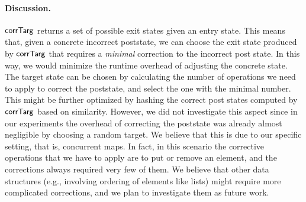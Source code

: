 \paragraph{Discussion.}
$\mathsf{corrTarg}$ returns a set of possible exit states given an entry state. This means that, given a concrete incorrect poststate, we can choose the exit state produced by $\mathsf{corrTarg}$ that requires a \emph{minimal} correction to the incorrect post state. In this way, we would minimize the runtime overhead of adjusting the concrete state. The target state can be chosen by calculating the number of operations we need to apply to correct the poststate, and select the one with the minimal number. This might be further optimized by hashing the correct post states computed by $\mathsf{corrTarg}$ based on similarity.
However, we did not investigate this aspect since in our experiments the overhead of correcting the poststate was already almost negligible by choosing a random target. We believe that this is due to our specific setting, that is, concurrent maps. In fact, in this scenario the corrective operations that we have to apply are to put or remove an element, and the corrections always required very few of them. We believe that other data structures (e.g., involving ordering of elements like lists) might require more complicated corrections, and we plan to investigate them as future work.


